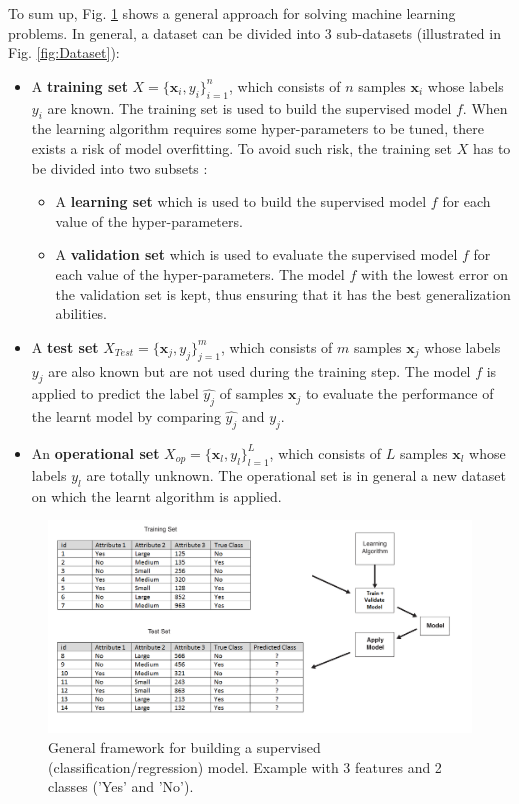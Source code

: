 \noindent To sum up, Fig. \ref{fig:LearningFramework} shows a general approach for solving machine learning problems. In general, a dataset can be divided into 3 sub-datasets (illustrated in Fig. \ref{fig:Dataset}):
\begin{itemize}
	\item A \textbf{training set} $X=\{\textbf{x}_i,y_i\}_{i=1}^n$, which consists of $n$ samples $\textbf{x}_i$ whose labels $y_i$ are known. The training set is used to build the supervised model $f$. When the learning algorithm requires some hyper-parameters to be tuned, there exists a risk of model overfitting. To avoid such risk, the training set $X$ has to be divided into two subsets :
	\begin{itemize}
		\item A \textbf{learning set} which is used to build the supervised model $f$ for each value of the hyper-parameters.
		\item A \textbf{validation set} which is used to evaluate the supervised model $f$ for each value of the hyper-parameters. The model $f$ with the lowest error on the validation set is kept, thus ensuring that it has the best generalization abilities.
	\end{itemize}
	\item A \textbf{test set} $X_{Test}=\{\textbf{x}_j,y_j\}_{j=1}^m$, which consists of $m$ samples $\textbf{x}_j$ whose labels $y_j$ are also known but are not used during the training step. The model $f$ is applied to predict the label $\hat{y_j}$ of samples $\textbf{x}_j$ to evaluate the performance of the learnt model by comparing $\hat{y_j}$ and $y_j$. 
	\item An \textbf{operational set} $X_{op}=\{\textbf{x}_l,y_l\}_{l=1}^L$, which consists of $L$ samples $\textbf{x}_l$ whose labels $y_l$ are totally unknown. The operational set is in general a new dataset on which the learnt algorithm is applied. 
\end{itemize}


\begin{figure}[h!]
	\centering
	\includegraphics[width=1\linewidth]{images/LearningFramework}
	\caption{General framework for building a supervised (classification/regression) model. Example with 3 features and 2 classes ('Yes' and 'No').}
	\label{fig:LearningFramework}
\end{figure}

